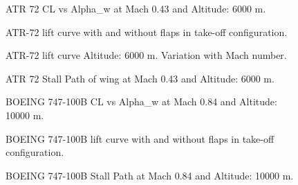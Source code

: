 \begin{figure}[H]
\centering

\caption{ATR 72 CL vs Alpha_w at Mach 0.43 and Altitude: 6000 m.}
\label{fig:clATR}
\end{figure}

\begin{figure}[H]
\centering

\caption{ATR-72 lift curve with and without flaps in take-off configuration.}
\label{fig:clATR}
\end{figure}

\begin{figure}[H]
\centering

\caption{ATR-72 lift curve Altitude: 6000 m. Variation with Mach number.}
\label{fig:clATR}
\end{figure}


\begin{figure}[H]
\centering

\caption{ATR 72 Stall Path of wing at Mach 0.43 and Altitude: 6000 m.}
\label{fig:stallATR}
\end{figure}

\begin{figure}[H]
\centering

\caption{BOEING 747-100B CL vs Alpha_w at Mach 0.84 and Altitude: 10000 m.}
\label{fig:clB}
\end{figure}

\begin{figure}[H]
\centering

\caption{BOEING 747-100B  lift curve with and without flaps in take-off configuration.}
\label{fig:clATR}
\end{figure}

\begin{figure}[H]
\centering

\caption{BOEING 747-100B Stall Path at Mach 0.84 and Altitude: 10000 m.}
\label{fig:stallB}
\end{figure}



	 	 
